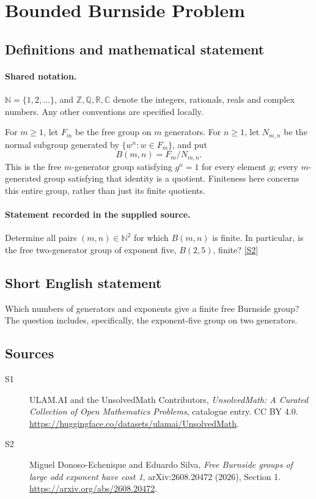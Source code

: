 \documentclass[11pt]{article}
\newcommand{\sref}[2]{\hyperlink{source:#1:#2}{[S#2]}}
\begin{document}
\section{Bounded Burnside Problem}\label{statement}

\subsection{Definitions and mathematical statement}

\paragraph{Shared notation.}$\mathbb N=\{1,2,\ldots\}$, and $\mathbb Z,\mathbb Q,\mathbb R,\mathbb C$ denote the integers, rationals, reals and complex numbers. Any other conventions are specified locally.


For \(m\ge1\), let \(F_m\) be the free group on \(m\) generators.
For \(n\ge1\), let \(N_{m,n}\) be the normal subgroup generated by
\(\{w^n:w\in F_m\}\), and put
\[
 B(m,n)=F_m/N_{m,n}.
\]
This is the free \(m\)-generator group satisfying \(g^n=1\) for every
element \(g\); every \(m\)-generated group satisfying that identity is a quotient.
Finiteness here concerns this entire group, rather than just its finite quotients.
\paragraph{Statement recorded in the supplied source.}
Determine all pairs \((m,n)\in\mathbb N^2\) for which
\(B(m,n)\) is finite.  In particular, is the free two-generator
group of exponent five, \(B(2,5)\), finite? \sref{statement}{2}
\subsection{Short English statement}
Which numbers of generators and exponents give a finite free Burnside group? The question includes, specifically, the exponent-five group on two generators.
\subsection{Sources}
\begin{description}
\item[\hypertarget{source:statement:1}{S1}] ULAM.AI and the UnsolvedMath Contributors, \emph{UnsolvedMath: A Curated Collection of Open Mathematics Problems}, catalogue entry. CC BY 4.0. \url{https://huggingface.co/datasets/ulamai/UnsolvedMath}.
\item[\hypertarget{source:statement:2}{S2}] Miguel Donoso-Echenique and Eduardo Silva, \emph{Free Burnside groups of large odd exponent have cost 1}, arXiv:2608.20472 (2026), Section 1. \url{https://arxiv.org/abs/2608.20472}.
\end{description}
\label{end:statement}
\end{document}
